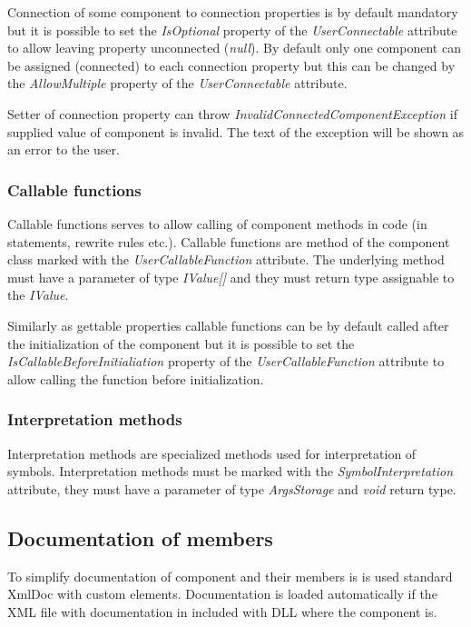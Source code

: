 Connection of some component to connection properties is by default mandatory but it is possible to set the \emph{IsOptional} property of the \emph{UserConnectable} attribute to allow leaving property unconnected (\emph{null}).
By default only one component can be assigned (connected) to each connection property but this can be changed by the \emph{AllowMultiple} property of the \emph{UserConnectable} attribute.

Setter of connection property can throw \emph{InvalidConnectedComponentException} if supplied value of component is invalid.
The text of the exception will be shown as an error to the user.


\subsubsection{Callable functions}

Callable functions serves to allow calling of component methods in \lsystem code (in statements, rewrite rules etc.).
Callable functions are method of the component class marked with the \emph{UserCallableFunction} attribute.
The underlying method must have a parameter of type \emph{IValue[]} and they must return type assignable to the \emph{IValue}.

Similarly as gettable properties callable functions can be by default called after the initialization of the component but it is possible to set the \emph{IsCallableBeforeInitialiation} property of the \emph{UserCallableFunction} attribute to allow calling the function before initialization.


\subsubsection{Interpretation methods}

Interpretation methods are specialized methods used for interpretation of symbols.
Interpretation methods must be marked with the \emph{SymbolInterpretation} attribute, they must have a parameter of type \emph{ArgsStorage} and \emph{void} return type.


\subsection{Documentation of members}

To simplify documentation of component and their members is is used standard XmlDoc with custom elements.
Documentation is loaded automatically if the XML file with documentation in included with DLL where the component is.

